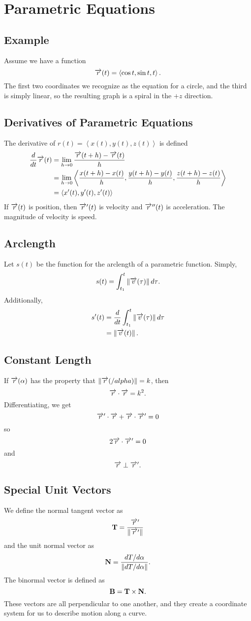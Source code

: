 \documentclass[12pt]{article}
\theoremstyle{plain} %
\theoremstyle{definition}
\theoremstyle{definition}
\theoremstyle{remark}
\newcommand{\vecv}{\vv{v}}
\newcommand{\vecr}{\vv{r}}
\newcommand{\angled}[1]{\left\langle {#1} \right\rangle}
\newcommand*{\vv}[1]{\overrightarrow{\mkern0mu#1}}
\renewcommand{\norm}[1]{\left\lVert#1\right\rVert}
\begin{document}
\section{Parametric Equations}
\subsection{Example}
Assume we have a function
\[ \vv{r}(t) = \angled{\cos{t},\sin{t},t}. \]
The first two coordinates we recognize as the equation for a circle, and the third is simply linear, so the resulting graph is a spiral in the $+z$ direction.
\subsection{Derivatives of Parametric Equations}
The derivative of $r(t) = \angled{x(t),y(t),z(t)}$ is defined
\begin{align*}
\frac{d}{dt} \vv{r}(t) &= \lim_{h \rightarrow 0} \frac{\vv{r}(t+h)-\vv{r}(t)}{h} \\
& = \lim_{h \rightarrow 0} \angled{\frac{x(t+h)-x(t)}{h},\frac{y(t+h)-y(t)}{h},\frac{z(t+h)-z(t)}{h}} \\
& = \angled{x^\prime(t),y^\prime(t),z^\prime(t)}
\end{align*}
If $\vecr(t)$ is position, then $\vecr^\prime(t)$ is velocity and $\vecr^{\prime\prime}(t)$ is acceleration. The magnitude of velocity is speed.

\subsection{Arclength}
Let $s(t)$ be the function for the arclength of a parametric function. Simply,
\[ s(t) = \int_{t_1}^t{\norm{\vecv(\tau)}d\tau}. \]
Additionally,
\begin{align*}
s^\prime(t) & = \frac{d}{dt} \int_{t_1}^t{\norm{\vecv(\tau)}d\tau} \\
& = \norm{\vecv(t)}.
\end{align*}

\subsection{Constant Length}
If $\vecr(\alpha)$ has the property that $\norm{\vecr(/alpha)} = k$, then
\[ \vecr \cdot \vecr = k^2.\]
Differentiating, we get
\[ \vecr^\prime \cdot \vecr + \vecr \cdot \vecr^\prime = 0 \]
so
\[ 2 \vecr \cdot \vecr^\prime = 0 \]
and
\[ \vecr \perp \vecr^\prime.\]

\subsection{Special Unit Vectors}
We define the normal tangent vector as \[\vb{T} = \frac{\vecr^\prime}{\norm{\vecr^\prime}}\] and the unit normal vector as \[\vb{N} = \frac{dT/d\alpha}{\norm{dT/d\alpha}}.\]
The binormal vector is defined as \[\vb{B} = \vb{T} \times \vb{N}. \]
These vectors are all perpendicular to one another, and they create a coordinate system for us to describe motion along a curve.
\end{document}
